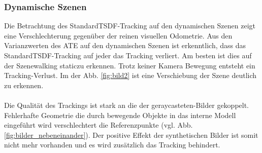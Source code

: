 \documentclass[12pt,DIV=15,BCOR=15mm,twoside,headsepline,abstract=true,listof=totoc,bibliography=totoc]{scrreprt}
\theoremstyle{remark}    %
\begin{document}
    \subsubsection{Dynamische Szenen}
    Die Betrachtung des \glqq Standard\grqq \ac{TSDF}-Tracking auf den dynamischen Szenen zeigt eine Verschlechterung gegenüber der reinen visuellen Odometrie.
    Aus den Varianzwerten des \ac{ATE} auf den dynamischen Szenen ist erkenntlich, dass das \glqq Standard\grqq \ac{TSDF}-Tracking auf jeder das Tracking 
    verliert. Am besten ist dies auf der Szene\glqq walking static\grqq zu erkennen. Trotz keiner Kamera Bewegung entsteht ein Tracking-Verlust. Im der Abb. \ref{fig:bild2} ist eine 
    Verschiebung der Szene deutlich zu erkennen.\\\\
    Die Qualität des Trackings ist stark an die der geraycasteten-Bilder gekoppelt. Fehlerhafte Geometrie die durch bewegende Objekte in das interne 
    Modell eingeführt wird verschlechtert die Referenzpunkte (vgl. Abb. \ref{fig:bilder_nebeneinander}). Der positive Effekt der synthetischen Bilder ist somit nicht mehr 
    vorhanden und es wird zusätzlich das Tracking behindert.\\\\
\end{document}

